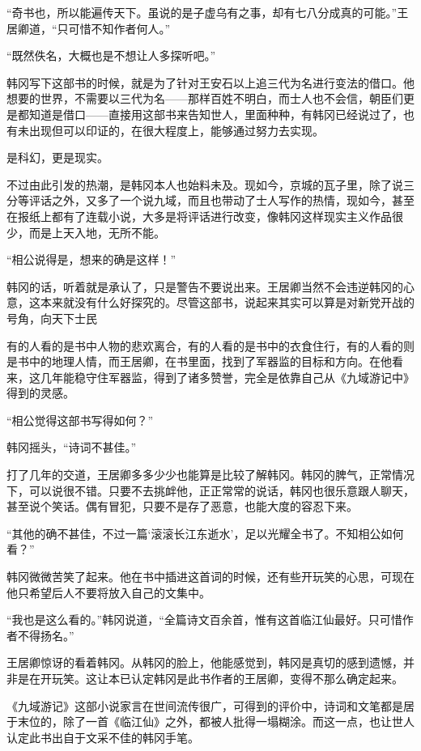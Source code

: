 “奇书也，所以能遍传天下。虽说的是子虚乌有之事，却有七八分成真的可能。”王居卿道，“只可惜不知作者何人。”

“既然佚名，大概也是不想让人多探听吧。”

韩冈写下这部书的时候，就是为了针对王安石以上追三代为名进行变法的借口。他想要的世界，不需要以三代为名——那样百姓不明白，而士人也不会信，朝臣们更是都知道是借口——直接用这部书来告知世人，里面种种，有韩冈已经说过了，也有未出现但可以印证的，在很大程度上，能够通过努力去实现。

是科幻，更是现实。

不过由此引发的热潮，是韩冈本人也始料未及。现如今，京城的瓦子里，除了说三分等评话之外，又多了一个说九域，而且也带动了士人写作的热情，现如今，甚至在报纸上都有了连载小说，大多是将评话进行改变，像韩冈这样现实主义作品很少，而是上天入地，无所不能。

“相公说得是，想来的确是这样！”

韩冈的话，听着就是承认了，只是警告不要说出来。王居卿当然不会违逆韩冈的心意，这本来就没有什么好探究的。尽管这部书，说起来其实可以算是对新党开战的号角，向天下士民

有的人看的是书中人物的悲欢离合，有的人看的是书中的衣食住行，有的人看的则是书中的地理人情，而王居卿，在书里面，找到了军器监的目标和方向。在他看来，这几年能稳守住军器监，得到了诸多赞誉，完全是依靠自己从《九域游记中》得到的灵感。

“相公觉得这部书写得如何？”

韩冈摇头，“诗词不甚佳。”

打了几年的交道，王居卿多多少少也能算是比较了解韩冈。韩冈的脾气，正常情况下，可以说很不错。只要不去挑衅他，正正常常的说话，韩冈也很乐意跟人聊天，甚至说个笑话。偶有冒犯，只要不是存了恶意，也能大度的容忍下来。

“其他的确不甚佳，不过一篇‘滚滚长江东逝水’，足以光耀全书了。不知相公如何看？”

韩冈微微苦笑了起来。他在书中插进这首词的时候，还有些开玩笑的心思，可现在他只希望后人不要将放入自己的文集中。

“我也是这么看的。”韩冈说道，“全篇诗文百余首，惟有这首临江仙最好。只可惜作者不得扬名。”

王居卿惊讶的看着韩冈。从韩冈的脸上，他能感觉到，韩冈是真切的感到遗憾，并非是在开玩笑。这让本已认定韩冈是此书作者的王居卿，变得不那么确定起来。

《九域游记》这部小说家言在世间流传很广，可得到的评价中，诗词和文笔都是居于末位的，除了一首《临江仙》之外，都被人批得一塌糊涂。而这一点，也让世人认定此书出自于文采不佳的韩冈手笔。

